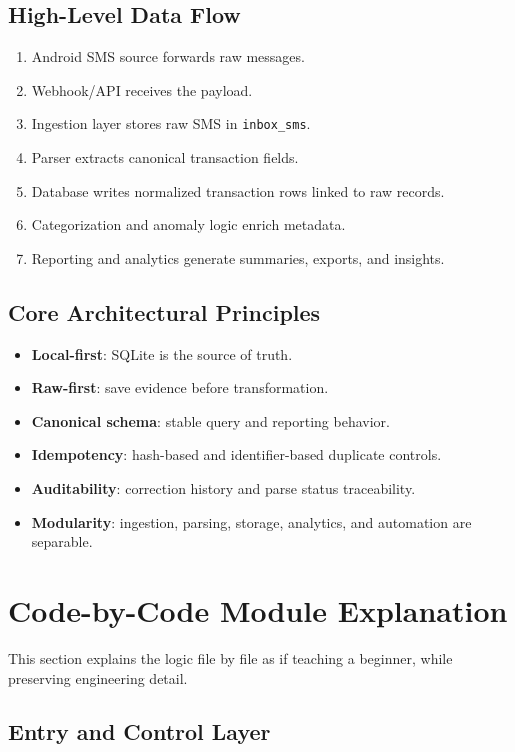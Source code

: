 \documentclass[12pt,a4paper]{article}
\begin{document}
\subsection{High-Level Data Flow}
\begin{enumerate}[leftmargin=1.5em]
  \item Android SMS source forwards raw messages.
  \item Webhook/API receives the payload.
  \item Ingestion layer stores raw SMS in \texttt{inbox\_sms}.
  \item Parser extracts canonical transaction fields.
  \item Database writes normalized transaction rows linked to raw records.
  \item Categorization and anomaly logic enrich metadata.
  \item Reporting and analytics generate summaries, exports, and insights.
\end{enumerate}

\subsection{Core Architectural Principles}
\begin{itemize}[leftmargin=1.5em]
  \item \textbf{Local-first}: SQLite is the source of truth.
  \item \textbf{Raw-first}: save evidence before transformation.
  \item \textbf{Canonical schema}: stable query and reporting behavior.
  \item \textbf{Idempotency}: hash-based and identifier-based duplicate controls.
  \item \textbf{Auditability}: correction history and parse status traceability.
  \item \textbf{Modularity}: ingestion, parsing, storage, analytics, and automation are separable.
\end{itemize}

\section{Code-by-Code Module Explanation}
This section explains the logic file by file as if teaching a beginner, while preserving engineering detail.

\subsection{Entry and Control Layer}
\end{document}
